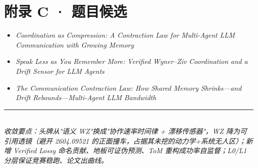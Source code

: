 \documentclass[UTF8,fontset=windows,11pt]{ctexart}
\begin{document}
\section*{附录 C · 题目候选}
\begin{itemize}\small
\item \emph{Coordination as Compression: A Contraction Law for Multi-Agent LLM Communication with Growing Memory}
\item \emph{Speak Less as You Remember More: Verified Wyner--Ziv Coordination and a Drift Sensor for LLM Agents}
\item \emph{The Communication Contraction Law: How Shared Memory Shrinks---and Drift Rebounds---Multi-Agent LLM Bandwidth}
\end{itemize}

\vspace{4mm}
\noindent\rule{\linewidth}{0.4pt}\\[1mm]
{\footnotesize\itshape 收敛要点：头牌从"语义 WZ"换成"协作速率时间律 + 漂移传感器"，WZ 降为可引用透镜（避开 2604.09521 的正面撞车，占据其未挖的动力学+系统无人区）；新增 Verified Lossy 命名贡献、地板可证伪预测、ToM 重构成功率自监督；L0/L1 分层保证竞赛稳跑、论文出曲线。}
\end{document}
